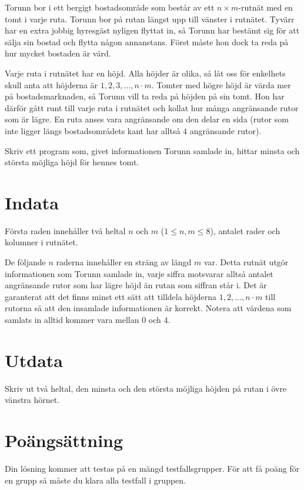 

\noindent
Torunn bor i ett bergigt bostadsområde som består av ett $n \times m$-rutnät med en tomt i varje ruta.
Torunn bor på rutan längst upp till vänster i rutnätet.
Tyvärr har en extra jobbig hyresgäst nyligen flyttat in, så Torunn har bestämt sig för att sälja sin bostad och flytta någon annanstans.
Först måste hon dock ta reda på hur mycket bostaden är värd.

Varje ruta i rutnätet har en höjd. Alla höjder är olika, så låt oss för enkelhets skull anta att höjderna är $1, 2, 3, \dots, n\cdot m$.
Tomter med högre höjd är värda mer på bostadsmarknaden, så Torunn vill ta reda på höjden på sin tomt. Hon har därför gått runt till varje ruta i rutnätet och kollat hur många angränsande rutor som är lägre.
En ruta anses vara angränsande om den delar en sida (rutor som inte ligger längs bostadsområdets kant har alltså $4$ angränsande rutor).

Skriv ett program som, givet informationen Torunn samlade in, hittar minsta och största möjliga höjd för hennes tomt.

\section*{Indata}
Första raden innehåller två heltal $n$ och $m$ ($1 \leq n,m \leq 8$), antalet rader och kolumner i rutnätet.

De följande $n$ raderna innehåller en sträng av längd $m$ var.
Detta rutnät utgör informationen som Torunn samlade in, varje siffra motsvarar alltså antalet angränsande rutor som har lägre höjd än rutan som siffran står i.
Det är garanterat att det finns minst ett sätt att tilldela höjderna $1, 2, \dots, n\cdot m$ till rutorna så att den insamlade informationen är korrekt.
Notera att värdena som samlats in alltid kommer vara mellan $0$ och $4$.

\section*{Utdata}
Skriv ut två heltal, den minsta och den största möjliga höjden på rutan i övre vänstra hörnet.

\section*{Poängsättning}
Din lösning kommer att testas på en mängd testfallsgrupper.
För att få poäng för en grupp så måste du klara alla testfall i gruppen.

